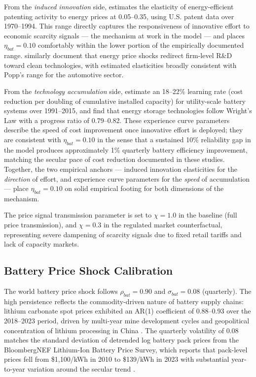 \documentclass[12pt, a4paper]{article}
\begin{document}
From the \textit{induced innovation} side, \citet{popp2002} estimates the elasticity of energy-efficient patenting activity to energy prices at 0.05--0.35, using U.S. patent data over 1970--1994. This range directly captures the responsiveness of innovative effort to economic scarcity signals --- the mechanism at work in the model --- and places $\eta_{bat} = 0.10$ comfortably within the lower portion of the empirically documented range. \citet{aghion2016} similarly document that energy price shocks redirect firm-level R\&D toward clean technologies, with estimated elasticities broadly consistent with Popp's range for the automotive sector.

From the \textit{technology accumulation} side, \citet{kittner2017} estimate an 18--22\% learning rate (cost reduction per doubling of cumulative installed capacity) for utility-scale battery systems over 1991--2015, and \citet{way2022} find that energy storage technologies follow Wright's Law with a progress ratio of 0.79--0.82. These experience curve parameters describe the speed of cost improvement once innovative effort is deployed; they are consistent with $\eta_{bat} = 0.10$ in the sense that a sustained 10\% reliability gap in the model produces approximately 1\% quarterly battery efficiency improvement, matching the secular pace of cost reduction documented in these studies. Together, the two empirical anchors --- induced innovation elasticities for the \textit{direction} of effort, and experience curve parameters for the \textit{speed} of accumulation --- place $\eta_{bat} = 0.10$ on solid empirical footing for both dimensions of the mechanism.

The price signal transmission parameter is set to $\chi = 1.0$ in the baseline (full price transmission), and $\chi = 0.3$ in the regulated market counterfactual, representing severe dampening of scarcity signals due to fixed retail tariffs and lack of capacity markets.

\subsection{Battery Price Shock Calibration}

The world battery price shock follows $\rho_{bat} = 0.90$ and $\sigma_{bat} = 0.08$ (quarterly). The high persistence reflects the commodity-driven nature of battery supply chains: lithium carbonate spot prices exhibited an AR(1) coefficient of 0.88--0.93 over the 2018--2023 period, driven by multi-year mine development cycles and geopolitical concentration of lithium processing in China \citep{bloombergnef2023}. The quarterly volatility of 0.08 matches the standard deviation of detrended log battery pack prices from the BloombergNEF Lithium-Ion Battery Price Survey, which reports that pack-level prices fell from \$1,100/kWh in 2010 to \$139/kWh in 2023 with substantial year-to-year variation around the secular trend \citep{bloombergnef2023}.
\end{document}
